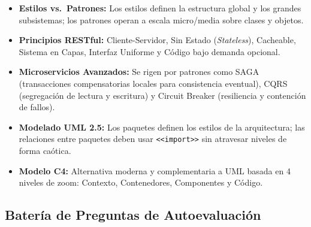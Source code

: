 \begin{tcolorbox}[
  enhanced,
  colback=secondary!5!bglight,
  colframe=secondary,
  arc=3mm,
  boxrule=1pt,
  title={\bfseries\color{white} Resumen de Conceptos Clave del Tema 2},
  coltitle=white
]
\begin{itemize}[leftmargin=1.5em]
  \item \textbf{Estilos vs.\ Patrones:} Los estilos definen la estructura global y los grandes subsistemas; los patrones operan a escala micro/media sobre clases y objetos.
  \item \textbf{Principios RESTful:} Cliente-Servidor, Sin Estado (\emph{Stateless}), Cacheable, Sistema en Capas, Interfaz Uniforme y Código bajo demanda opcional.
  \item \textbf{Microservicios Avanzados:} Se rigen por patrones como SAGA (transacciones compensatorias locales para consistencia eventual), CQRS (segregación de lectura y escritura) y Circuit Breaker (resiliencia y contención de fallos).
  \item \textbf{Modelado UML 2.5:} Los paquetes definen los estilos de la arquitectura; las relaciones entre paquetes deben usar \texttt{<<import>>} sin atravesar niveles de forma caótica.
  \item \textbf{Modelo C4:} Alternativa moderna y complementaria a UML basada en 4 niveles de zoom: Contexto, Contenedores, Componentes y Código.
\end{itemize}
\end{tcolorbox}

\subsection{Batería de Preguntas de Autoevaluación}

